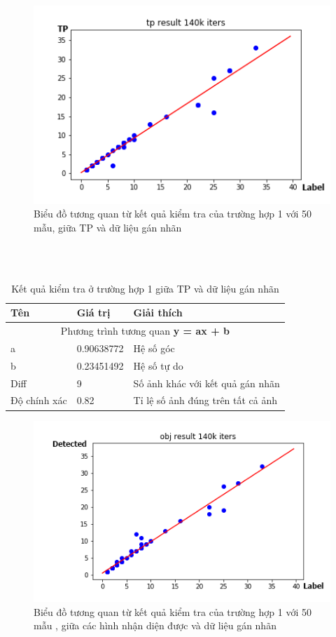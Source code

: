 \begin{center}
    \begin{figure}[htp]
    \centering
    \includegraphics[width=0.9\columnwidth]{images/chap3/tp_140k.png}
    \caption{Biểu đồ tương quan từ kết quả kiểm tra của trường hợp 1 với 50 mẫu, giữa TP và dữ liệu gán nhãn}
    \label{fig:my_label}
    \end{figure}
\end{center}
~\\
~\\
\begin{table}[H]
    \begin{tabular}{p{4cm}  p{2.5cm}  p{5.5cm} }
    \hline		
	Tên & Giá trị & Giải thích \\
	\hline
	\multicolumn{3}{c}{Phương trình tương quan \textbf{y = ax + b}} \\
	a & 0.90638772 & Hệ số góc \\
	b & 0.23451492 & Hệ số tự do \\
	\hline
	Diff & 9 & Số ảnh khác với kết quả gán nhãn \\
	Độ chính xác & 0.82 &  Tỉ lệ số ảnh đúng trên tất cả ảnh\\
	\hline
	\end{tabular}
	\caption{Kết quả kiểm tra ở trường hợp 1 giữa TP và dữ liệu gán nhãn}
    \label{chap3:case2:table02}    
\end{table}
\begin{center}
    \begin{figure}[htp]
    \centering
    \includegraphics[width=0.9\columnwidth]{images/chap3/all_140k.png}
    \caption{Biểu đồ tương quan từ kết quả kiểm tra của trường hợp 1 với 50 mẫu , giữa các hình nhận diện được và dữ liệu gán nhãn}
    \label{fig:my_label}
    \end{figure}
\end{center}

